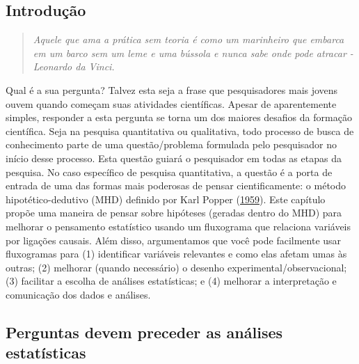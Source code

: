 \documentclass[
]{article}
\begin{document}
\hypertarget{introduuxe7uxe3o-1}{%
\subsection{Introdução}\label{introduuxe7uxe3o-1}}

\begin{quote}
\emph{Aquele que ama a prática sem teoria é como um marinheiro que embarca em um barco sem um leme e uma bússola e nunca sabe onde pode atracar - Leonardo da Vinci.}
\end{quote}

Qual é a sua pergunta? Talvez esta seja a frase que pesquisadores mais jovens ouvem quando começam suas atividades científicas. Apesar de aparentemente simples, responder a esta pergunta se torna um dos maiores desafios da formação científica. Seja na pesquisa quantitativa ou qualitativa, todo processo de busca de conhecimento parte de uma questão/problema formulada pelo pesquisador no início desse processo. Esta questão guiará o pesquisador em todas as etapas da pesquisa. No caso específico de pesquisa quantitativa, a questão é a porta de entrada de uma das formas mais poderosas de pensar cientificamente: o método hipotético-dedutivo (MHD) definido por Karl Popper (\protect\hyperlink{ref-popper_logic_1959}{1959}). Este capítulo propõe uma maneira de pensar sobre hipóteses (geradas dentro do MHD) para melhorar o pensamento estatístico usando um fluxograma que relaciona variáveis por ligações causais. Além disso, argumentamos que você pode facilmente usar fluxogramas para (1) identificar variáveis relevantes e como elas afetam umas às outras; (2) melhorar (quando necessário) o desenho experimental/observacional; (3) facilitar a escolha de análises estatísticas; e (4) melhorar a interpretação e comunicação dos dados e análises.

\hypertarget{perguntas-devem-preceder-as-anuxe1lises-estatuxedsticas}{%
\subsection{Perguntas devem preceder as análises estatísticas}\label{perguntas-devem-preceder-as-anuxe1lises-estatuxedsticas}}
\end{document}
